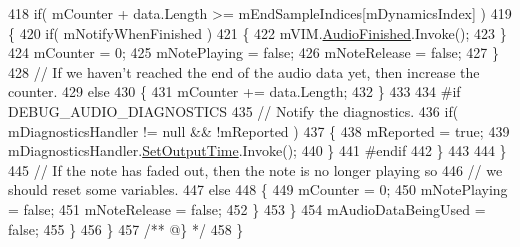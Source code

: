 \begin{DoxyCodeInclude}
418                         \textcolor{keywordflow}{if}( mCounter + data.Length >= mEndSampleIndices[mDynamicsIndex] )
419                         \{
420                             \textcolor{keywordflow}{if}( mNotifyWhenFinished )
421                             \{
422                                 mVIM.\hyperlink{group___v_i_m_events_ga39ffa8215ab5c9ad46c563e2bd87c219}{AudioFinished}.Invoke();
423                             \}
424                             mCounter = 0;
425                             mNotePlaying = \textcolor{keyword}{false};
426                             mNoteRelease = \textcolor{keyword}{false};
427                         \}
428                         \textcolor{comment}{// If we haven't reached the end of the audio data yet, then increase the counter.}
429                         \textcolor{keywordflow}{else}
430                         \{
431                             mCounter += data.Length;
432                         \}
433 
434 \textcolor{preprocessor}{                        #if DEBUG\_AUDIO\_DIAGNOSTICS}
435                             \textcolor{comment}{// Notify the diagnostics.}
436                             \textcolor{keywordflow}{if}( mDiagnosticsHandler != null && !mReported )
437                             \{
438                                 mReported = \textcolor{keyword}{true};
439                                 mDiagnosticsHandler.\hyperlink{group___audio_testing_a6360e6098323b921b4a1b306914d06ef}{SetOutputTime}.Invoke();
440                             \}
441 \textcolor{preprocessor}{                        #endif}
442                     \}
443 
444                 \}
445                 \textcolor{comment}{// If the note has faded out, then the note is no longer playing so}
446                 \textcolor{comment}{// we should reset some variables.}
447                 \textcolor{keywordflow}{else}
448                 \{
449                     mCounter = 0;
450                     mNotePlaying = \textcolor{keyword}{false};
451                     mNoteRelease = \textcolor{keyword}{false};
452                 \}
453             \}
454             mAudioDataBeingUsed = \textcolor{keyword}{false};
455         \}
456     \}\textcolor{comment}{}
457 \textcolor{comment}{    /** @\} */}
458 \}
\end{DoxyCodeInclude}
 